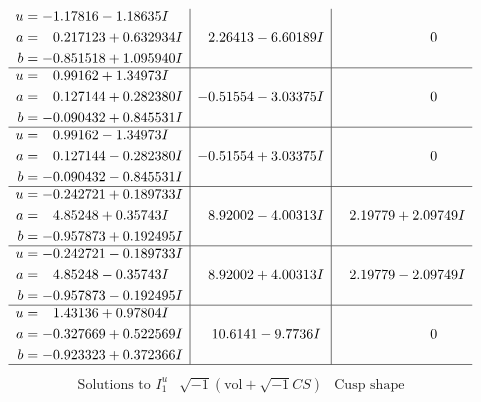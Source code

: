\documentclass[1p]{elsarticle_modified}
\theoremstyle{definition}
\newcommand{\I}{\sqrt{-1}}
\begin{document}
$$\begin{array}{c|c|c}
\begin{aligned}
u &= -1.17816 - 1.18635 I \\
a &= \phantom{-}0.217123 + 0.632934 I \\
b &= -0.851518 + 1.095940 I\end{aligned}
 & \phantom{-}2.26413 - 6.60189 I & \phantom{-0.000000 } 0 \\ \hline\begin{aligned}
u &= \phantom{-}0.99162 + 1.34973 I \\
a &= \phantom{-}0.127144 + 0.282380 I \\
b &= -0.090432 + 0.845531 I\end{aligned}
 & -0.51554 - 3.03375 I & \phantom{-0.000000 } 0 \\ \hline\begin{aligned}
u &= \phantom{-}0.99162 - 1.34973 I \\
a &= \phantom{-}0.127144 - 0.282380 I \\
b &= -0.090432 - 0.845531 I\end{aligned}
 & -0.51554 + 3.03375 I & \phantom{-0.000000 } 0 \\ \hline\begin{aligned}
u &= -0.242721 + 0.189733 I \\
a &= \phantom{-}4.85248 + 0.35743 I \\
b &= -0.957873 + 0.192495 I\end{aligned}
 & \phantom{-}8.92002 - 4.00313 I & \phantom{-}2.19779 + 2.09749 I \\ \hline\begin{aligned}
u &= -0.242721 - 0.189733 I \\
a &= \phantom{-}4.85248 - 0.35743 I \\
b &= -0.957873 - 0.192495 I\end{aligned}
 & \phantom{-}8.92002 + 4.00313 I & \phantom{-}2.19779 - 2.09749 I \\ \hline\begin{aligned}
u &= \phantom{-}1.43136 + 0.97804 I \\
a &= -0.327669 + 0.522569 I \\
b &= -0.923323 + 0.372366 I\end{aligned}
 & \phantom{-}10.6141 - 9.7736 I & \phantom{-0.000000 } 0\\
 \hline 
 \end{array}$$\newpage$$\begin{array}{c|c|c}  
\text{Solutions to }I^u_{1}& \I (\text{vol} + \sqrt{-1}CS) & \text{Cusp shape}\\
 \hline 
\begin{aligned}

\end{aligned}
\end{array}$$
\end{document}
